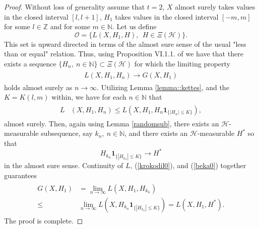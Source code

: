 \documentclass[a4paper]{article}
\newcommand{\indicator}[1]{\mathbf{1}_{\{ #1 \}}}
\begin{document}
\begin{proof}
Without loss of generality assume that $t=2$, $X$ almost surely takes values in the closed interval $[l,l+1]$, $H_1$ takes values in the closed interval $[-m,m]$ for some $l \in \mathbb{Z}$ and for some $m \in \mathbb{N}$. Let us define
\begin{equation*}
\mathcal{O} = \Big\{  L(X,H_1, H), \ \ H \in \Xi(\mathcal{H})   \Big\}.
\end{equation*}
This set is upward directed in terms of the almost sure sense of the usual "less than or equal" relation. Thus, using Proposition VI.1.1. of \cite{neveu} we have that there exists a sequence $\{ H_n, \ n\in\mathbb{N} \} \subset \Xi(\mathcal{H})$ for which the limiting property
\begin{align}\label{krokodil0}
\begin{split}
 L(X, H_1, H_n ) \to G(X,H_1) 
\end{split}
\end{align}
holds almost surely as $n \to \infty$. Utilizing Lemma \ref{lemma::kettes}, and the $K = K(l,m)$ within, we have for each $n \in\mathbb{N}$ that
\begin{align}\label{beka0}
\begin{split}
L&(  X, H_1, H_n) \leq L(X, H_1, H_n \indicator{|H_n| \leq K}),
\end{split}
\end{align}
almost surely. Then, again using Lemma \ref{randomsub}, there exists an $\mathcal{H}$-measurable subsequence, 
say $k_n, \ n \in \mathbb{N}$, and there exists an $\mathcal{H}$-measurable $H^*$ so that 
$$
H_{k_n} \indicator{|H_{k_n}| \leq K} \to H^*
$$
in the almost sure sense. Continuity of $L$, (\ref{krokodil0}), and (\ref{beka0}) together guarantees
\begin{align*}
\begin{split}
G(X,H_1) &= \lim_{n \to \infty} L(X,H_1, H_{k_n} ) 
\\
\leq&
\lim_{n \to \infty} L(X, H_{k_n} \indicator{|H_{k_n}| \leq K}) = L(X,H_1, H^*).
\end{split}
\end{align*}
The proof is complete.
\end{proof}
\end{document}
